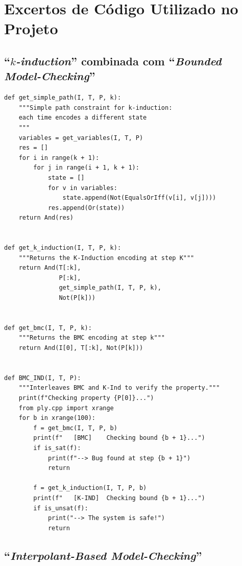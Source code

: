 \documentclass[11pt,a4paper]{report}%
\newenvironment{code}{\captionsetup{type=listing}}{}
\def\bmc{``\textit{Bounded Model-Checking}''\xspace}
\def\imc{``\textit{Interpolant-Based Model-Checking}''\xspace}
\def\kind{``\textit{$k$-induction}''\xspace}
\begin{document}
\appendix %
\chapter{Excertos de Código Utilizado no Projeto} \label{apndx:samples}

\section{\kind combinada com \bmc}

\begin{code}
\begin{verbatim}
def get_simple_path(I, T, P, k):
    """Simple path constraint for k-induction:
    each time encodes a different state
    """
    variables = get_variables(I, T, P)
    res = []
    for i in range(k + 1):
        for j in range(i + 1, k + 1):
            state = []
            for v in variables:
                state.append(Not(EqualsOrIff(v[i], v[j])))
            res.append(Or(state))
    return And(res)


def get_k_induction(I, T, P, k):
    """Returns the K-Induction encoding at step K"""
    return And(T[:k],
               P[:k],
               get_simple_path(I, T, P, k),
               Not(P[k]))


def get_bmc(I, T, P, k):
    """Returns the BMC encoding at step k"""
    return And(I[0], T[:k], Not(P[k]))


def BMC_IND(I, T, P):
    """Interleaves BMC and K-Ind to verify the property."""
    print(f"Checking property {P[0]}...")
    from ply.cpp import xrange
    for b in xrange(100):
        f = get_bmc(I, T, P, b)
        print(f"   [BMC]    Checking bound {b + 1}...")
        if is_sat(f):
            print(f"--> Bug found at step {b + 1}")
            return

        f = get_k_induction(I, T, P, b)
        print(f"   [K-IND]  Checking bound {b + 1}...")
        if is_unsat(f):
            print("--> The system is safe!")
            return
\end{verbatim}
\caption{Implementação do algoritmo de BMC + \kind retirada de \href{https://pysmt.readthedocs.io/en/latest/tutorials.html##model-checking-an-infinite-state-system-bmc-k-induction-in-150-lines}{documentação de PySMT}}
\label{code:bmc_kind}
\end{code}

\section{\imc}
\end{document}
